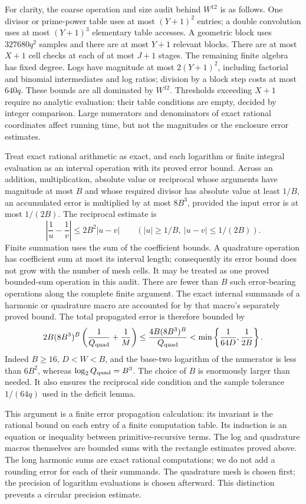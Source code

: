 \documentclass[11pt]{article}
\theoremstyle{definition}
\theoremstyle{remark}
\newcommand{\abs}[1]{\left|#1\right|}
\begin{document}
For clarity, the coarse operation and size audit behind $W^{12}$ is as follows.
One divisor or prime-power table uses at most $(Y+1)^2$ entries; a double
convolution uses at most $(Y+1)^3$ elementary table accesses. A geometric
block uses $327680q^2$ samples and there are at most $Y+1$ relevant blocks.
There are at most $X+1$ cell checks at each of at most $J+1$ stages.
The remaining finite algebra has fixed degree. Logs have magnitude at most
$2(Y+1)^2$, including factorial and binomial intermediates and log ratios;
division by a block
step costs at most $640q$. These bounds are all dominated by $W^{12}$.
Thresholds exceeding $X+1$ require no analytic evaluation: their table
conditions are empty, decided by integer comparison. Large numerators and
denominators of exact rational coordinates affect running time, but not
the magnitudes or the enclosure error estimates.

Treat exact rational arithmetic as exact, and each logarithm or finite
integral evaluation as an interval operation with its proved error bound.
Across an addition, multiplication, absolute value or reciprocal whose
arguments have magnitude at most $B$ and whose required divisor has
absolute value at least $1/B$, an accumulated error is multiplied by at
most $8B^3$, provided the input error is at most $1/(2B)$.
The reciprocal estimate is
\[
 \abs{\frac1u-\frac1v}
 \le 2B^2|u-v|\qquad
 (|u|\ge1/B,\ |u-v|\le1/(2B)).
\]
Finite summation uses the sum of the coefficient bounds. A quadrature
operation has coefficient sum at most its interval length; consequently its
error bound does not grow with the number of mesh cells. It may be
treated as one proved bounded-sum operation in this audit.
There are fewer than $B$ such error-bearing operations along the complete
finite argument. The exact internal summands of a harmonic or quadrature
macro are accounted for by that macro's separately proved bound.
The total propagated error is therefore bounded by
\begin{equation}\label{eq:budget-bound}
 2B(8B^3)^B\left(\frac1{Q_{\rm quad}}+\frac1M\right)
 \le\frac{4B(8B^3)^B}{Q_{\rm quad}}
 <\min\left\{\frac1{64D},\frac1{2B}\right\}.
\end{equation}
Indeed $B\ge16$, $D<W<B$, and the base-two logarithm of the numerator is
less than $6B^2$, whereas $\log_2 Q_{\rm quad}=B^3$. The choice of $B$ is enormously
larger than needed. It also ensures the reciprocal side condition and the
sample tolerance $1/(64q)$ used in the deficit lemma.

This argument is a finite error propagation calculation: its invariant is
the rational bound on each entry of a finite computation table. Its induction
is an equation or inequality between primitive-recursive terms. The log and
quadrature macros themselves are bounded sums with the rectangle estimates
proved above. The long harmonic sums are exact rational computations; we
do not add a rounding error for each of their summands. The quadrature mesh
is chosen first; the precision of logarithm evaluations is chosen afterward.
This distinction prevents a circular precision estimate.
\end{document}
